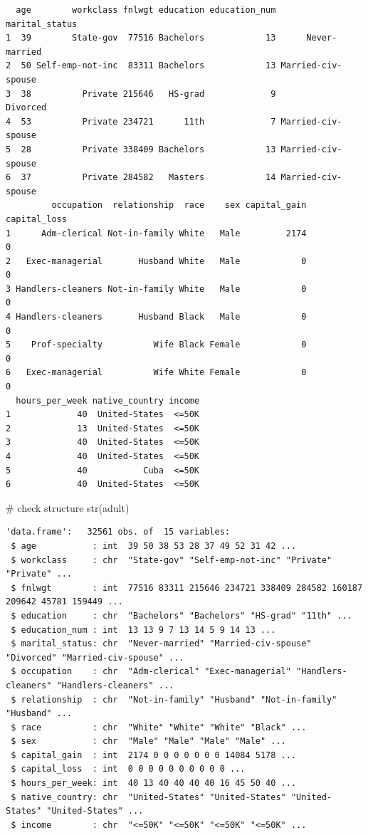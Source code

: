 \documentclass[
  letterpaper,
  DIV=11,
  numbers=noendperiod]{scrartcl}
\newenvironment{Shaded}{\begin{snugshade}}{\end{snugshade}}
\newcommand{\CommentTok}[1]{\textcolor[rgb]{0.37,0.37,0.37}{#1}}
\newcommand{\FunctionTok}[1]{\textcolor[rgb]{0.28,0.35,0.67}{#1}}
\newcommand{\NormalTok}[1]{\textcolor[rgb]{0.00,0.23,0.31}{#1}}
\begin{document}
\begin{verbatim}
  age        workclass fnlwgt education education_num     marital_status
1  39        State-gov  77516 Bachelors            13      Never-married
2  50 Self-emp-not-inc  83311 Bachelors            13 Married-civ-spouse
3  38          Private 215646   HS-grad             9           Divorced
4  53          Private 234721      11th             7 Married-civ-spouse
5  28          Private 338409 Bachelors            13 Married-civ-spouse
6  37          Private 284582   Masters            14 Married-civ-spouse
         occupation  relationship  race    sex capital_gain capital_loss
1      Adm-clerical Not-in-family White   Male         2174            0
2   Exec-managerial       Husband White   Male            0            0
3 Handlers-cleaners Not-in-family White   Male            0            0
4 Handlers-cleaners       Husband Black   Male            0            0
5    Prof-specialty          Wife Black Female            0            0
6   Exec-managerial          Wife White Female            0            0
  hours_per_week native_country income
1             40  United-States  <=50K
2             13  United-States  <=50K
3             40  United-States  <=50K
4             40  United-States  <=50K
5             40           Cuba  <=50K
6             40  United-States  <=50K
\end{verbatim}

\begin{Shaded}
\begin{Highlighting}[]
\CommentTok{\# check structure}
\FunctionTok{str}\NormalTok{(adult)}
\end{Highlighting}
\end{Shaded}

\begin{verbatim}
'data.frame':   32561 obs. of  15 variables:
 $ age           : int  39 50 38 53 28 37 49 52 31 42 ...
 $ workclass     : chr  "State-gov" "Self-emp-not-inc" "Private" "Private" ...
 $ fnlwgt        : int  77516 83311 215646 234721 338409 284582 160187 209642 45781 159449 ...
 $ education     : chr  "Bachelors" "Bachelors" "HS-grad" "11th" ...
 $ education_num : int  13 13 9 7 13 14 5 9 14 13 ...
 $ marital_status: chr  "Never-married" "Married-civ-spouse" "Divorced" "Married-civ-spouse" ...
 $ occupation    : chr  "Adm-clerical" "Exec-managerial" "Handlers-cleaners" "Handlers-cleaners" ...
 $ relationship  : chr  "Not-in-family" "Husband" "Not-in-family" "Husband" ...
 $ race          : chr  "White" "White" "White" "Black" ...
 $ sex           : chr  "Male" "Male" "Male" "Male" ...
 $ capital_gain  : int  2174 0 0 0 0 0 0 0 14084 5178 ...
 $ capital_loss  : int  0 0 0 0 0 0 0 0 0 0 ...
 $ hours_per_week: int  40 13 40 40 40 40 16 45 50 40 ...
 $ native_country: chr  "United-States" "United-States" "United-States" "United-States" ...
 $ income        : chr  "<=50K" "<=50K" "<=50K" "<=50K" ...
\end{verbatim}
\end{document}
